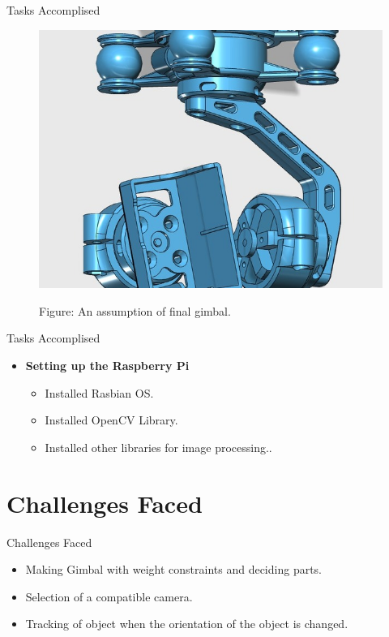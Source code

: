\documentclass[10pt, a4paper]{beamer}
\begin{document}
\begin{frame}{Tasks Accomplised}
	\begin{figure}
		\begin{center}
			\includegraphics[scale=0.4]{Final_Gimbal.jpg}
		\end{center}
		\begin{center}
			Figure: An assumption of final gimbal.
		\end{center}
	\end{figure}
\end{frame}
\begin{frame}{Tasks Accomplised}
	\begin{itemize}		
		\item \textbf{Setting up the Raspberry Pi}
		\begin{itemize}
			\item Installed Rasbian OS.
			\item Installed OpenCV Library.
			\item Installed other libraries for image processing..
		\end{itemize}
	\end{itemize}
\end{frame}

\section{Challenges Faced}
\begin{frame}{Challenges Faced}
	\begin{itemize}
		\item Making Gimbal with weight constraints and deciding parts.
		\item Selection of a compatible camera.
		\item Tracking of object when the orientation of the object is changed.  
	\end{itemize}
\end{frame}
\end{document}
